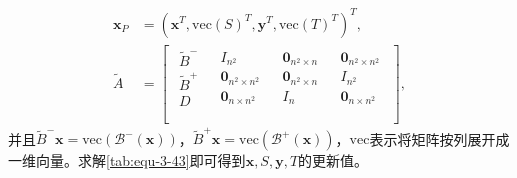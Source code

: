 \begin{equation}
    \label{tab:equ-3-44}
    \begin{aligned}
        \mathbf{x}_P&=\left( \mathbf{x}^T,\mathrm{vec}\left( S \right) ^T,\mathbf{y}^T,\mathrm{vec}\left( T \right) ^T \right) ^T, \\
        \tilde{A}&=\left[ \begin{matrix}
            \begin{array}{c}
            \tilde{B}^-\\
            \tilde{B}^+\\
            D\\
        \end{array}&		\begin{array}{c}
            I_{n^2}\\
            \mathbf{0}_{n^2\times n^2}\\
            \mathbf{0}_{n\times n^2}\\
        \end{array}&		\begin{array}{c}
            \mathbf{0}_{n^2\times n}\\
            \mathbf{0}_{n^2\times n}\\
            I_n\\
        \end{array}&		\begin{array}{c}
            \mathbf{0}_{n^2\times n^2}\\
            I_{n^2}\\
            \mathbf{0}_{n\times n^2}\\
        \end{array}\\
        \end{matrix} \right] ,
    \end{aligned}
\end{equation}
并且$\tilde{B}^-\mathbf{x}=\mathrm{vec}\left( \mathcal{B} ^-\left( \mathbf{x} \right) \right)$，$\tilde{B}^+\mathbf{x}=\mathrm{vec}\left( \mathcal{B} ^+\left( \mathbf{x} \right) \right)$，$\mathrm{vec}$表示将矩阵按列展开成一维向量。求解\autoref{tab:equ-3-43}即可得到$\mathbf{x},S,\mathbf{y},T$的更新值。

